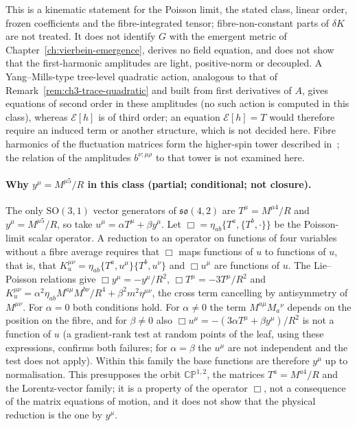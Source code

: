 This is a kinematic statement for the Poisson limit, the stated class, linear order, frozen coefficients and the fibre-integrated tensor; fibre-non-constant parts of \(\delta K\) are not treated. It does not identify \(G\) with the emergent metric of Chapter~\ref{ch:vierbein-emergence}, derives no field equation, and does not show that the first-harmonic amplitudes are light, positive-norm or decoupled. A Yang--Mills-type tree-level quadratic action, analogous to that of Remark~\ref{rem:ch3-trace-quadratic} and built from first derivatives of \(A\), gives equations of second order in these amplitudes (no such action is computed in this class), whereas \(\mathcal E[h]\) is of third order; an equation \(\mathcal E[h]=T\) would therefore require an induced term or another structure, which is not decided here. Fibre harmonics of the fluctuation matrices form the higher-spin tower described in~\cite{SperlingSteinacker2019,MantaSteinacker2025}; the relation of the amplitudes \(b^{\nu;\mu\rho}\) to that tower is not examined here.

\paragraph{Why \(y^\mu=M^{\mu5}/R\) in this class (partial; conditional; not closure).}
The only \(\mathrm{SO}(3,1)\) vector generators of \(\mathfrak{so}(4,2)\) are \(T^\mu=M^{\mu4}/R\) and \(y^\mu=M^{\mu5}/R\), so take \(u^\mu=\alpha T^\mu+\beta y^\mu\). Let \(\Box=\eta_{ab}\{T^a,\{T^b,\cdot\}\}\) be the Poisson-limit scalar operator. A reduction to an operator on functions of four variables without a fibre average requires that \(\Box\) maps functions of \(u\) to functions of \(u\), that is, that \(K_u^{\mu\nu}=\eta_{ab}\{T^a,u^\mu\}\{T^b,u^\nu\}\) and \(\Box u^\mu\) are functions of \(u\). The Lie--Poisson relations give \(\Box y^\mu=-y^\mu/R^2\), \(\Box T^\mu=-3T^\mu/R^2\) and \(K_u^{\mu\nu}=\alpha^2\eta_{ab}M^{a\mu}M^{b\nu}/R^4+\beta^2m^2\eta^{\mu\nu}\), the cross term cancelling by antisymmetry of \(M^{\mu\nu}\). For \(\alpha=0\) both conditions hold. For \(\alpha\neq0\) the term \(M^{a\mu}M_a{}^{\nu}\) depends on the position on the fibre, and for \(\beta\neq0\) also \(\Box u^\mu=-(3\alpha T^\mu+\beta y^\mu)/R^2\) is not a function of \(u\) (a gradient-rank test at random points of the leaf, using these expressions, confirms both failures; for \(\alpha=\beta\) the \(u^\mu\) are not independent and the test does not apply). Within this family the base functions are therefore \(y^\mu\) up to normalisation. This presupposes the orbit \(\mathbb{CP}^{1,2}\), the matrices \(T^a=M^{a4}/R\) and the Lorentz-vector family; it is a property of the operator \(\Box\), not a consequence of the matrix equations of motion, and it does not show that the physical reduction is the one by \(y^\mu\).

